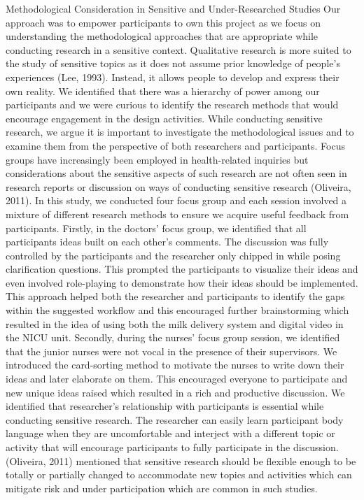 Methodological Consideration in Sensitive and Under-Researched Studies
Our approach was to empower participants to own this project as we focus on understanding the methodological approaches that are appropriate while conducting research in a sensitive context.  Qualitative research is more suited to the study of sensitive topics as it does not assume prior knowledge of people’s experiences (Lee, 1993). Instead, it allows people to develop and express their own reality. We identified that there was a hierarchy of power among our participants and we were curious to identify the research methods that would encourage engagement in the design activities. While conducting sensitive research, we argue it is important to investigate the methodological issues and to examine them from the perspective of both researchers and participants.
Focus groups have increasingly been employed in health-related inquiries but considerations about the sensitive aspects of such research are not often seen in research reports or discussion on ways of conducting sensitive research (Oliveira, 2011). In this study, we conducted four focus group and each session involved a mixture of different research methods to ensure we acquire useful feedback from participants. 
Firstly, in the doctors’ focus group, we identified that all participants ideas built on each other’s comments. The discussion was fully controlled by the participants and the researcher only chipped in while posing clarification questions. This prompted the participants to visualize their ideas and even involved role-playing to demonstrate how their ideas should be implemented. This approach helped both the researcher and participants to identify the gaps within the suggested workflow and this encouraged further brainstorming which resulted in the idea of using both the milk delivery system and digital video in the NICU unit.
Secondly, during the nurses’ focus group session, we identified that the junior nurses were not vocal in the presence of their supervisors. We introduced the card-sorting method to motivate the nurses to write down their ideas and later elaborate on them. This encouraged everyone to participate and new unique ideas raised which resulted in a rich and productive discussion. We identified that researcher’s relationship with participants is essential while conducting sensitive research. The researcher can easily learn participant body language when they are uncomfortable and interject with a different topic or activity that will encourage participants to fully participate in the discussion. (Oliveira, 2011) mentioned that sensitive research should be flexible enough to be totally or partially changed to accommodate new topics and activities which can mitigate risk and under participation which are common in such studies.
